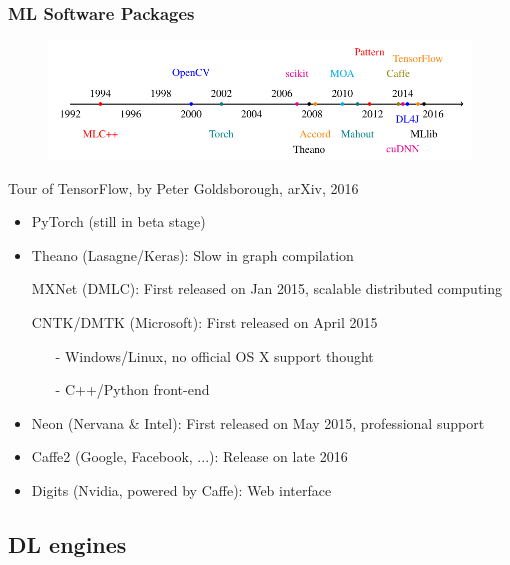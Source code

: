 
\begin{frame}
  \MyLogo
  \frametitle{ML Software Packages}  

\vskip -10pt
\begin{figure}[htbp] %
   \centering
   \includegraphics[width=0.8\linewidth]{figures/ML.pdf} 
\end{figure}
\begin{center}
\vskip -12pt
{\color{red} \scriptsize
Tour of TensorFlow, by Peter Goldsborough, arXiv, 2016}
\end{center}

\pause 

	\begin{itemize}\setlength\itemsep{0.25em}\footnotesize
	\item PyTorch (still in \alert{beta} stage)
	\item Theano (Lasagne/Keras): Slow in graph compilation
	\item[\raisebox{-0.4ex}{\alert{\HandRight}}] MXNet (DMLC): First released on Jan 2015, scalable distributed computing
	\item[\raisebox{-0.4ex}{\alert{\HandRight}}] CNTK/DMTK (Microsoft): First released on April 2015
		\begin{itemize}
		\item[-] Windows/Linux, no official OS X support thought
		\item[-] C++/Python front-end
		\end{itemize}
	\item Neon (Nervana \& Intel): First released on May 2015, professional support
	\item Caffe2 (Google, Facebook, ...): Release on late 2016
	\item Digits (Nvidia, powered by Caffe): Web interface
	\end{itemize}

\end{frame}

\subsection{DL engines}

